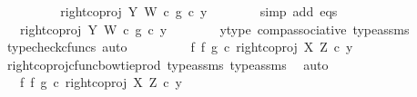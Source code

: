 \begin{isabellebody}
\ \ \ \ \isamarkupfalse%
\ \isamarkupfalse%
\ {\isachardoublequoteopen}{\isachardot}{\kern0pt}{\isachardot}{\kern0pt}{\isachardot}{\kern0pt}\ {\isacharequal}{\kern0pt}\ right{\isacharunderscore}{\kern0pt}coproj\ Y\ W\ {\isasymcirc}\isactrlsub c\ g\ {\isasymcirc}\isactrlsub c\ y{\isachardoublequoteclose}\isanewline
\ \ \ \ \ \ \isamarkupfalse%
\ {\isacharparenleft}{\kern0pt}simp\ add{\isacharcolon}{\kern0pt}\ eqs{\isacharparenright}{\kern0pt}\isanewline
\ \ \ \ \isamarkupfalse%
\ \isamarkupfalse%
\ {\isachardoublequoteopen}{\isachardot}{\kern0pt}{\isachardot}{\kern0pt}{\isachardot}{\kern0pt}\ {\isacharequal}{\kern0pt}\ {\isacharparenleft}{\kern0pt}right{\isacharunderscore}{\kern0pt}coproj\ Y\ W\ {\isasymcirc}\isactrlsub c\ g{\isacharparenright}{\kern0pt}\ {\isasymcirc}\isactrlsub c\ y{\isachardoublequoteclose}\isanewline
\ \ \ \ \ \ \isamarkupfalse%
\ y{\isacharunderscore}{\kern0pt}type{}\ comp{\isacharunderscore}{\kern0pt}associative{}\ type{\isacharunderscore}{\kern0pt}assms{\isacharparenleft}{\kern0pt}{}{\isacharparenright}{\kern0pt}\ \isamarkupfalse%
\ {\isacharparenleft}{\kern0pt}typecheck{\isacharunderscore}{\kern0pt}cfuncs{\isacharcomma}{\kern0pt}\ auto{\isacharparenright}{\kern0pt}\isanewline
\ \ \ \ \isamarkupfalse%
\ \isamarkupfalse%
\ {\isachardoublequoteopen}{\isachardot}{\kern0pt}{\isachardot}{\kern0pt}{\isachardot}{\kern0pt}\ {\isacharequal}{\kern0pt}\ {\isacharparenleft}{\kern0pt}{\isacharparenleft}{\kern0pt}f\ {\isasymbowtie}\isactrlsub f\ g{\isacharparenright}{\kern0pt}\ {\isasymcirc}\isactrlsub c\ right{\isacharunderscore}{\kern0pt}coproj\ X\ Z{\isacharparenright}{\kern0pt}\ {\isasymcirc}\isactrlsub c\ y{\isachardoublequoteclose}\isanewline
\ \ \ \ \ \ \isamarkupfalse%
\ right{\isacharunderscore}{\kern0pt}coproj{\isacharunderscore}{\kern0pt}cfunc{\isacharunderscore}{\kern0pt}bowtie{\isacharunderscore}{\kern0pt}prod\ type{\isacharunderscore}{\kern0pt}assms{\isacharparenleft}{\kern0pt}{}{\isacharparenright}{\kern0pt}\ type{\isacharunderscore}{\kern0pt}assms{\isacharparenleft}{\kern0pt}{}{\isacharparenright}{\kern0pt}\ \isamarkupfalse%
\ auto\isanewline
\ \ \ \ \isamarkupfalse%
\ \isamarkupfalse%
\ {\isachardoublequoteopen}{\isachardot}{\kern0pt}{\isachardot}{\kern0pt}{\isachardot}{\kern0pt}\ {\isacharequal}{\kern0pt}\ {\isacharparenleft}{\kern0pt}f\ {\isasymbowtie}\isactrlsub f\ g{\isacharparenright}{\kern0pt}\ {\isasymcirc}\isactrlsub c\ right{\isacharunderscore}{\kern0pt}coproj\ X\ Z\ {\isasymcirc}\isactrlsub c\ y{\isachardoublequoteclose}\isanewline

\end{isabellebody}
